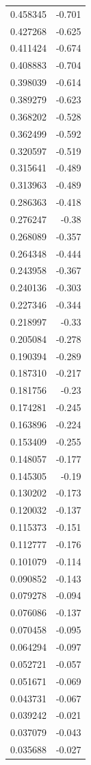 \documentclass[number, sort&compress, review, 12pt]{elsarticle}
\begin{document}
\begin{longtable}{rr}
0.458345 & -0.701\\
0.427268 & -0.625\\
0.411424 & -0.674\\
0.408883 & -0.704\\
0.398039 & -0.614\\
0.389279 & -0.623\\
0.368202 & -0.528\\
0.362499 & -0.592\\
0.320597 & -0.519\\
0.315641 & -0.489\\
0.313963 & -0.489\\
0.286363 & -0.418\\
0.276247 & -0.38\\
0.268089 & -0.357\\
0.264348 & -0.444\\
0.243958 & -0.367\\
0.240136 & -0.303\\
0.227346 & -0.344\\
0.218997 & -0.33\\
0.205084 & -0.278\\
0.190394 & -0.289\\
0.187310 & -0.217\\
0.181756 & -0.23\\
0.174281 & -0.245\\
0.163896 & -0.224\\
0.153409 & -0.255\\
0.148057 & -0.177\\
0.145305 & -0.19\\
0.130202 & -0.173\\
0.120032 & -0.137\\
0.115373 & -0.151\\
0.112777 & -0.176\\
0.101079 & -0.114\\
0.090852 & -0.143\\
0.079278 & -0.094\\
0.076086 & -0.137\\
0.070458 & -0.095\\
0.064294 & -0.097\\
0.052721 & -0.057\\
0.051671 & -0.069\\
0.043731 & -0.067\\
0.039242 & -0.021\\
0.037079 & -0.043\\
0.035688 & -0.027\\

\end{longtable}
\end{document}
